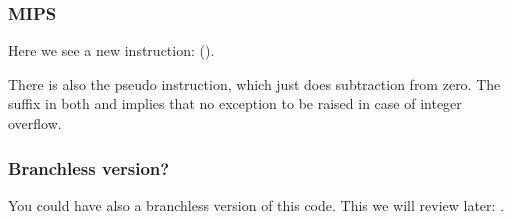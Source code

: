 

\subsubsection{MIPS}



Here we see a new instruction:  ().

There is also the  pseudo instruction, which just does subtraction from zero.
The  suffix in both  and  implies that no exception to be raised in case of integer overflow.

\subsubsection{Branchless version?}

You could have also a branchless version of this code. This we will review later: .
